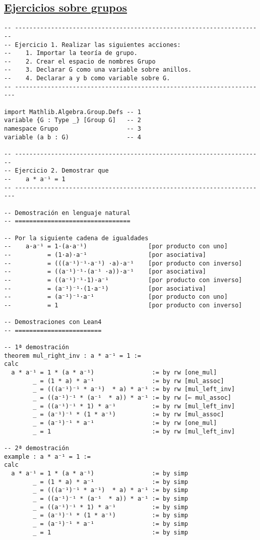 \subsection{\href{./src/Basicos/Ejercicios\_sobre\_grupos.lean}{Ejercicios sobre grupos}}
\label{sec:org74bc90e}
\begin{verbatim}
-- ---------------------------------------------------------------------
-- Ejercicio 1. Realizar las siguientes acciones:
--    1. Importar la teoría de grupo.
--    2. Crear el espacio de nombres Grupo
--    3. Declarar G como una variable sobre anillos.
--    4. Declarar a y b como variable sobre G.
-- ----------------------------------------------------------------------

import Mathlib.Algebra.Group.Defs -- 1
variable {G : Type _} [Group G]   -- 2
namespace Grupo                   -- 3
variable (a b : G)                -- 4

-- ---------------------------------------------------------------------
-- Ejercicio 2. Demostrar que
--    a * a⁻¹ = 1
-- ----------------------------------------------------------------------

-- Demostración en lenguaje natural
-- ================================

-- Por la siguiente cadena de igualdades
--    a·a⁻¹ = 1·(a·a⁻¹)                 [por producto con uno]
--          = (1·a)·a⁻¹                 [por asociativa]
--          = (((a⁻¹)⁻¹·a⁻¹) ·a)·a⁻¹    [por producto con inverso]
--          = ((a⁻¹)⁻¹·(a⁻¹ ·a))·a⁻¹    [por asociativa]
--          = ((a⁻¹)⁻¹·1)·a⁻¹           [por producto con inverso]
--          = (a⁻¹)⁻¹·(1·a⁻¹)           [por asociativa]
--          = (a⁻¹)⁻¹·a⁻¹               [por producto con uno]
--          = 1                         [por producto con inverso]

-- Demostraciones con Lean4
-- ========================

-- 1ª demostración
theorem mul_right_inv : a * a⁻¹ = 1 :=
calc
  a * a⁻¹ = 1 * (a * a⁻¹)                := by rw [one_mul]
        _ = (1 * a) * a⁻¹                := by rw [mul_assoc]
        _ = (((a⁻¹)⁻¹ * a⁻¹)  * a) * a⁻¹ := by rw [mul_left_inv]
        _ = ((a⁻¹)⁻¹ * (a⁻¹  * a)) * a⁻¹ := by rw [← mul_assoc]
        _ = ((a⁻¹)⁻¹ * 1) * a⁻¹          := by rw [mul_left_inv]
        _ = (a⁻¹)⁻¹ * (1 * a⁻¹)          := by rw [mul_assoc]
        _ = (a⁻¹)⁻¹ * a⁻¹                := by rw [one_mul]
        _ = 1                            := by rw [mul_left_inv]

-- 2ª demostración
example : a * a⁻¹ = 1 :=
calc
  a * a⁻¹ = 1 * (a * a⁻¹)                := by simp
        _ = (1 * a) * a⁻¹                := by simp
        _ = (((a⁻¹)⁻¹ * a⁻¹)  * a) * a⁻¹ := by simp
        _ = ((a⁻¹)⁻¹ * (a⁻¹  * a)) * a⁻¹ := by simp
        _ = ((a⁻¹)⁻¹ * 1) * a⁻¹          := by simp
        _ = (a⁻¹)⁻¹ * (1 * a⁻¹)          := by simp
        _ = (a⁻¹)⁻¹ * a⁻¹                := by simp
        _ = 1                            := by simp


\end{verbatim}
